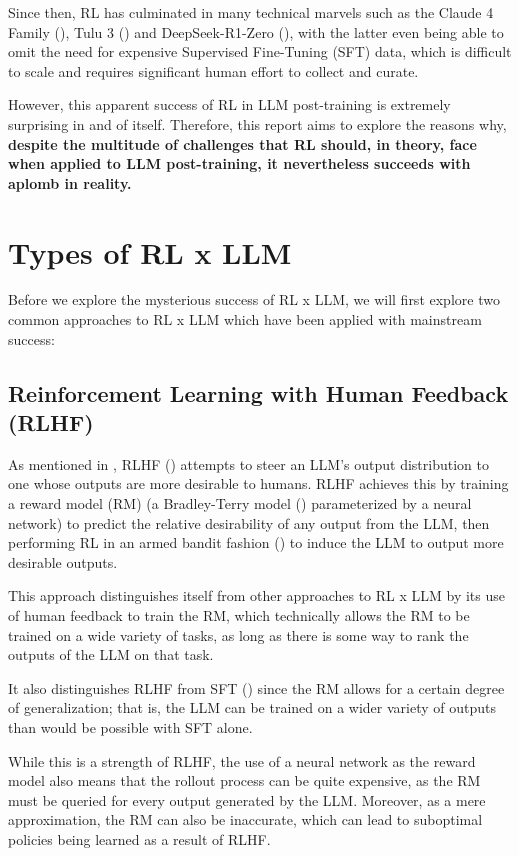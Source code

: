 \documentclass{article} %
\theoremstyle{definition}
\begin{document}
Since then, RL has culminated in many technical marvels such as 
the Claude 4 Family (\cite{Anthropic-2025}), Tulu 3 (\cite{Lambert-et-al-2024}) 
and DeepSeek-R1-Zero (\cite{DeepSeek-2025}),
with the latter even being able to omit the need for expensive
Supervised Fine-Tuning (SFT) data, which is difficult to scale
and requires significant human effort to collect and curate.

However, this apparent success of RL in LLM post-training 
is extremely surprising in and of itself. Therefore, this report aims to explore the reasons why,
\textbf{despite the multitude of challenges that RL should, in theory, 
face when applied to LLM post-training,
it nevertheless succeeds with aplomb in reality.}

\section{Types of RL x LLM}

Before we explore the mysterious success of RL x LLM,
we will first explore two common approaches to RL x LLM which
have been applied with mainstream success:

\subsection{Reinforcement Learning with Human Feedback (RLHF)}

As mentioned in \cite{beh-2025-b}, RLHF (\cite{Christiano-et-al-2017}) attempts 
to steer an LLM's output distribution to one whose outputs are more desirable to humans.
RLHF achieves this by training a reward model (RM) (a Bradley-Terry model 
(\cite{Bradley-and-Terry-1952}) parameterized by a neural network) to predict
the relative desirability of any output from the LLM, then 
performing RL in an armed bandit fashion (\cite{Sutton-and-Barto-1998})
to induce the LLM to output more desirable outputs.

This approach distinguishes itself from other approaches to RL x LLM
by its use of human feedback to train the RM, which technically allows the RM to
be trained on a wide variety of tasks, as long as there is 
some way to rank the outputs of the LLM on that task.

It also distinguishes RLHF from SFT (\cite{InstructGPT-2022}) since
the RM allows for a certain degree of generalization; that is,
the LLM can be trained on a wider variety of outputs than would be possible
with SFT alone.

While this is a strength of RLHF,
the use of a neural network as the reward model also means that
the rollout process can be quite expensive, as the RM must be queried
for every output generated by the LLM. Moreover, as a mere approximation,
the RM can also be inaccurate, which can lead to suboptimal policies being learned
as a result of RLHF.
\end{document}
